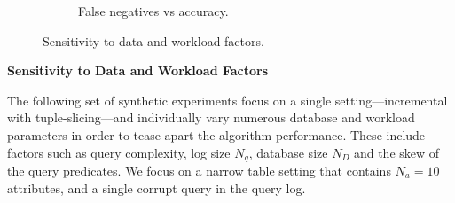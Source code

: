 \begin{figure}[ht]
\begin{subfigure}[t]{.33\textwidth}
      \vspace*{-.25in}
      \caption{False negatives vs accuracy.}
      \label{f:falsenegative_acc} 
    \end{subfigure}
    \vspace*{-.25in}
    \caption{Sensitivity to data and workload factors. }
    \vspace*{-.15in}
  \end{figure}


\noindent\textbf{Sensitivity to Data and Workload Factors}

The following set of synthetic experiments focus on a single \sys setting---incremental with tuple-slicing---and
individually vary numerous database and workload parameters in order to tease apart the algorithm performance.  
These include factors such as query complexity, log size $N_q$, database size $N_D$ and the skew of the query predicates.
We focus on a narrow table setting that contains $N_a = 10$ attributes, and a single corrupt query in the query log.




